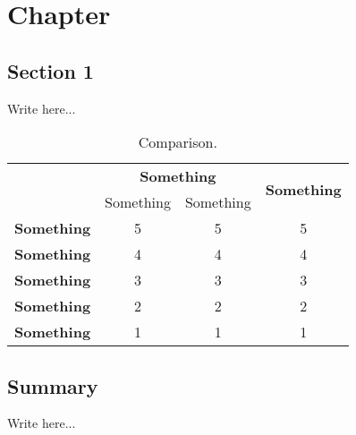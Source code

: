\chapter{Chapter} 

\section{Section 1}

Write here...

\begin{table}[]
  \begin{center}
  	\caption{Comparison.}
	\begin{tabular}[]{|l|c|c|c|}
		\hline
		\multirow {2}{*}{ } & \multicolumn{2}{c|}{\textbf{Something}} & \multirow {2}{*}{\textbf{Something}} \\
		\cline{2-3}
		& Something & Something & \\
		\hline
		\textbf{Something} & 5 & 5 & 5 \\
		\hline
		\textbf{Something} & 4 & 4 & 4 \\
		\hline
		\textbf{Something} & 3 & 3 & 3 \\
		\hline
		\textbf{Something} & 2 & 2 & 2 \\
		\hline
		\textbf{Something} & 1 & 1 & 1 \\
		\hline
	\end{tabular}
	\label{tab:tab1}
  \end{center}
\end{table}

\section{Summary}

Write here...
